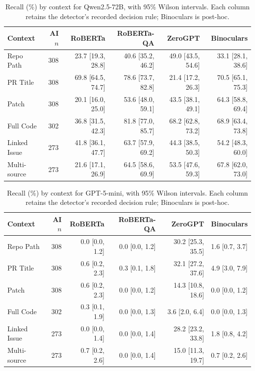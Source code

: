 \begin{table}[htbp]
\centering
\caption{Recall (\%) by context for Qwen2.5-72B, with 95\% Wilson intervals. Each column retains the detector's recorded decision rule; Binoculars is post-hoc.}
\label{tab:context_recall_intervals_1}
\small
\setlength{\tabcolsep}{4pt}
\renewcommand{\arraystretch}{1.15}
\begin{tabular}{lrrrrr}
\toprule
\textbf{Context} & \textbf{AI $n$} & \textbf{RoBERTa} & \textbf{RoBERTa-QA} & \textbf{ZeroGPT} & \textbf{Binoculars} \\
\midrule
Repo Path & 308 & 23.7 [19.3, 28.8] & 40.6 [35.2, 46.2] & 49.0 [43.5, 54.6] & 33.1 [28.1, 38.6] \\
PR Title & 308 & 69.8 [64.5, 74.7] & 78.6 [73.7, 82.8] & 21.4 [17.2, 26.3] & 70.5 [65.1, 75.3] \\
Patch & 308 & 20.1 [16.0, 25.0] & 53.6 [48.0, 59.1] & 43.5 [38.1, 49.1] & 64.3 [58.8, 69.4] \\
Full Code & 302 & 36.8 [31.5, 42.3] & 81.8 [77.0, 85.7] & 68.2 [62.8, 73.2] & 68.9 [63.4, 73.8] \\
Linked Issue & 273 & 41.8 [36.1, 47.7] & 63.7 [57.9, 69.2] & 44.3 [38.5, 50.3] & 54.2 [48.3, 60.0] \\
Multi-source & 273 & 21.6 [17.1, 26.9] & 64.5 [58.6, 69.9] & 53.5 [47.6, 59.3] & 67.8 [62.0, 73.0] \\
\bottomrule
\end{tabular}
\end{table}

\begin{table}[htbp]
\centering
\caption{Recall (\%) by context for GPT-5-mini, with 95\% Wilson intervals. Each column retains the detector's recorded decision rule; Binoculars is post-hoc.}
\label{tab:context_recall_intervals_2}
\small
\setlength{\tabcolsep}{4pt}
\renewcommand{\arraystretch}{1.15}
\begin{tabular}{lrrrrr}
\toprule
\textbf{Context} & \textbf{AI $n$} & \textbf{RoBERTa} & \textbf{RoBERTa-QA} & \textbf{ZeroGPT} & \textbf{Binoculars} \\
\midrule
Repo Path & 308 & 0.0 [0.0, 1.2] & 0.0 [0.0, 1.2] & 30.2 [25.3, 35.5] & 1.6 [0.7, 3.7] \\
PR Title & 308 & 0.6 [0.2, 2.3] & 0.3 [0.1, 1.8] & 32.1 [27.2, 37.6] & 4.9 [3.0, 7.9] \\
Patch & 308 & 0.6 [0.2, 2.3] & 0.0 [0.0, 1.2] & 14.3 [10.8, 18.6] & 0.0 [0.0, 1.2] \\
Full Code & 302 & 0.3 [0.1, 1.9] & 0.0 [0.0, 1.3] & 3.6 [2.0, 6.4] & 0.0 [0.0, 1.3] \\
Linked Issue & 273 & 0.0 [0.0, 1.4] & 0.0 [0.0, 1.4] & 28.2 [23.2, 33.8] & 1.8 [0.8, 4.2] \\
Multi-source & 273 & 0.7 [0.2, 2.6] & 0.0 [0.0, 1.4] & 15.0 [11.3, 19.7] & 0.7 [0.2, 2.6] \\
\bottomrule
\end{tabular}
\end{table}

